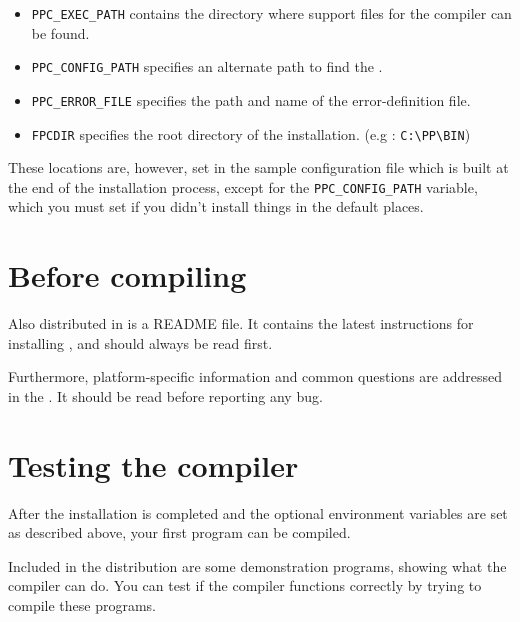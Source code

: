 \begin{itemize}
\item \verb|PPC_EXEC_PATH| contains the directory where support files for
the compiler can be found.
\item \verb|PPC_CONFIG_PATH| specifies an alternate path to find the .
\item \verb|PPC_ERROR_FILE|  specifies the path and name of the error-definition file.
\item \verb|FPCDIR| specifies the root directory of the \fpc installation.
(e.g : \verb|C:\PP\BIN|)
\end{itemize}

These locations are, however, set in the sample configuration file which is
built at the end of the installation process, except for the
\verb|PPC_CONFIG_PATH| variable, which you must set if you didn't install
things in the default places.

\section{Before compiling}

Also distributed in \fpc is a README file. It contains the latest
instructions for installing \fpc, and should always be read first.

Furthermore, platform-specific information and common questions
are addressed in the . It should be read before reporting any 
bug.


\section{Testing the compiler}

After the installation is completed and the optional environment variables 
are set as described above, your first program can be compiled.

Included in the \fpc distribution are some demonstration programs,
showing what the compiler can do.
You can test if the compiler functions correctly by trying to compile
these programs.


